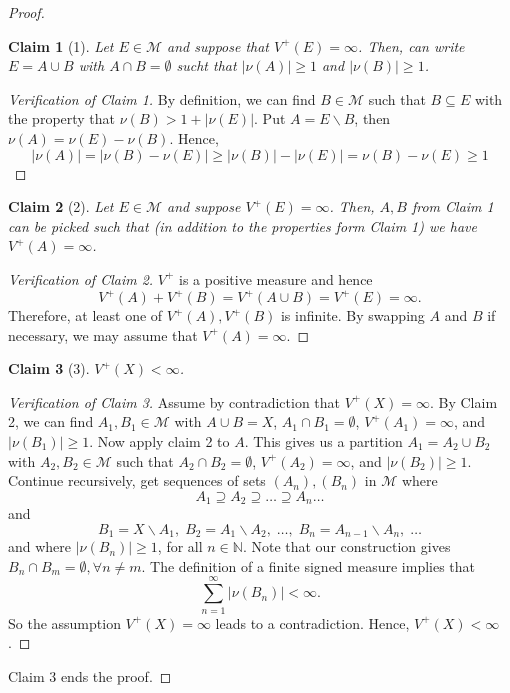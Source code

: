 \documentclass[letterpaper, 12pt]{article}
\newcommand{\cM}{\mathcal{M}}
\newcommand{\bN}{\mathbb{N}}
\theoremstyle{stdthm}
\theoremstyle{stddef}
\theoremstyle{stdnonum}
\newtheorem{claim}{Claim}
\theoremstyle{stdqands}
\theoremstyle{stdbold}
\begin{document}
\begin{proof}
\begin{claim}[1]
Let $E \in \cM$ and suppose that $V^+(E) = \infty$.  Then, can write $E = A\cup B$ with $A \cap B = \emptyset$ sucht that $|\nu(A)|\geq 1$ and $|\nu(B)| \geq 1$. 
\end{claim}

\begin{proof}[Verification of Claim 1]
By definition, we can find $B \in \cM$ such that $B \subseteq E$ with the property that $\nu(B) > 1 + |\nu(E)|$. Put $A = E\backslash B$, then $\nu(A) = \nu(E) - \nu(B)$. Hence, 
\[ |\nu(A) | = |\nu(B) - \nu(E)| \geq |\nu(B)| - |\nu(E)| = \nu(B) - \nu(E) \geq 1 \]
\end{proof}

\begin{claim}[2]
Let $E \in \cM$ and suppose $V^+(E) = \infty$. Then, $A,B$ from Claim 1 can be picked such that (in addition to the properties form Claim 1) we have $V^+(A) = \infty$. 
\end{claim}

\begin{proof} [Verification of Claim 2]
$V^+$ is a positive measure and hence 
\[
V^+(A) + V^+(B) = V^+(A\cup B) = V^+(E) = \infty.\]
Therefore, at least one of $V^+(A), V^+(B)$ is infinite. By swapping $A$ and $B$ if necessary, we may assume that $V^+(A) = \infty$. 
\end{proof}

\begin{claim}[3] $V^+(X) < \infty$.
\end{claim}

\begin{proof}[Verification of Claim 3]
Assume by contradiction that $V^+(X) = \infty$. By Claim 2, we can find $A_1,B_1 \in \cM$ with $A \cup B = X$, $A_1 \cap B_1 = \emptyset$, $V^+(A_1) = \infty$, and $|\nu(B_1)| \geq 1$. Now apply claim 2 to $A$. This gives us a partition $A_1 = A_2 \cup B_2$ with $A_2,B_2 \in \cM$ such that $A_2 \cap B_2 = \emptyset$, $V^+(A_2) = \infty$, and $|\nu(B_2)|\geq 1$. Continue recursively, get sequences of sets $(A_n),(B_n)$ in $\cM$ where 
\[
A_1 \supseteq A_2 \supseteq \dots \supseteq A_n \dots 
\] 
and 
\[
B_1 = X\backslash A_1,\; B_2 = A_1 \backslash A_2,\; \dots,\; B_n = A_{n-1}\backslash A_n,\; \dots
\]
 and where $|\nu(B_n)|\geq 1$, for all $n \in \bN$. Note that our construction gives $B_n \cap B_m = \emptyset, \forall n\neq m$. The definition of a finite signed measure implies that 
\[ \sum_{n=1}^\infty |\nu(B_n)| < \infty.\]
So the assumption $V^+(X) = \infty$ leads to a contradiction. Hence, $V^+(X) < \infty$. 
\end{proof}
Claim 3 ends the proof.
\end{proof}
\end{document}
